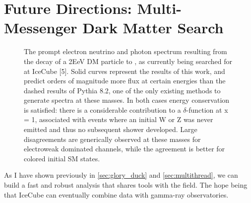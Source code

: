 \section{Future Directions: Multi-Messenger Dark Matter Search}\label{sec:future}

\begin{figure}[h]
    \caption{The prompt electron neutrino and photon spectrum resulting from the decay of a 2EeV DM particle to , as currently being searched for at IceCube [5]. Solid curves represent the results of this work, and predict orders of magnitude more flux at certain energies than the dashed results of Pythia 8.2, one of the only existing methods to generate spectra at these masses. In both cases energy conservation is satisfied: there is a considerable contribution to a $\delta$-function at x = 1, associated with events where an initial W or Z was never emitted and thus no subsequent shower developed. Large disagreements are generically observed at these masses for electroweak dominated channels, while the agreement is better for colored initial SM states.}
    \label{fig:nu_and_gam}
\end{figure}

As I have shown previously in \cref{sec:glory_duck} and \cref{sec:multithread}, we can build a fast and robust analysis that shares tools with the field.
The hope being that IceCube can eventually combine data with gamma-ray observatories.
